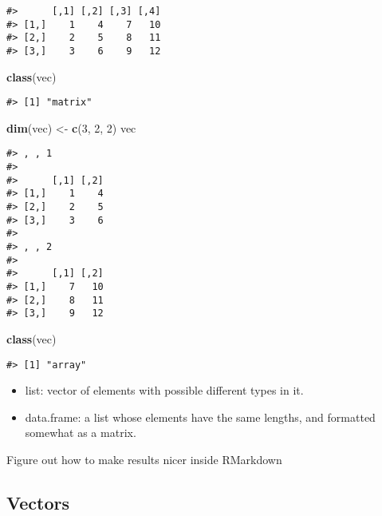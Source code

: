 \documentclass[]{book}
\newenvironment{Shaded}{\begin{snugshade}}{\end{snugshade}}
\newcommand{\KeywordTok}[1]{\textcolor[rgb]{0.13,0.29,0.53}{\textbf{#1}}}
\newcommand{\DecValTok}[1]{\textcolor[rgb]{0.00,0.00,0.81}{#1}}
\newcommand{\StringTok}[1]{\textcolor[rgb]{0.31,0.60,0.02}{#1}}
\newcommand{\NormalTok}[1]{#1}
\theoremstyle{definition}
\theoremstyle{definition}
\theoremstyle{definition}
\theoremstyle{remark}
\begin{document}
\begin{verbatim}
#>      [,1] [,2] [,3] [,4]
#> [1,]    1    4    7   10
#> [2,]    2    5    8   11
#> [3,]    3    6    9   12
\end{verbatim}

\begin{Shaded}
\begin{Highlighting}[]
\KeywordTok{class}\NormalTok{(vec)}
\end{Highlighting}
\end{Shaded}

\begin{verbatim}
#> [1] "matrix"
\end{verbatim}

\begin{Shaded}
\begin{Highlighting}[]
\KeywordTok{dim}\NormalTok{(vec) <-}\StringTok{ }\KeywordTok{c}\NormalTok{(}\DecValTok{3}\NormalTok{, }\DecValTok{2}\NormalTok{, }\DecValTok{2}\NormalTok{)}
\NormalTok{vec}
\end{Highlighting}
\end{Shaded}

\begin{verbatim}
#> , , 1
#> 
#>      [,1] [,2]
#> [1,]    1    4
#> [2,]    2    5
#> [3,]    3    6
#> 
#> , , 2
#> 
#>      [,1] [,2]
#> [1,]    7   10
#> [2,]    8   11
#> [3,]    9   12
\end{verbatim}

\begin{Shaded}
\begin{Highlighting}[]
\KeywordTok{class}\NormalTok{(vec)}
\end{Highlighting}
\end{Shaded}

\begin{verbatim}
#> [1] "array"
\end{verbatim}

\begin{itemize}
\item
  list: vector of elements with possible different types in it.
\item
  data.frame: a list whose elements have the same lengths, and formatted
  somewhat as a matrix.
\end{itemize}

{Figure out how to make results nicer inside RMarkdown}

\subsection{Vectors}\label{vectors}
\end{document}
